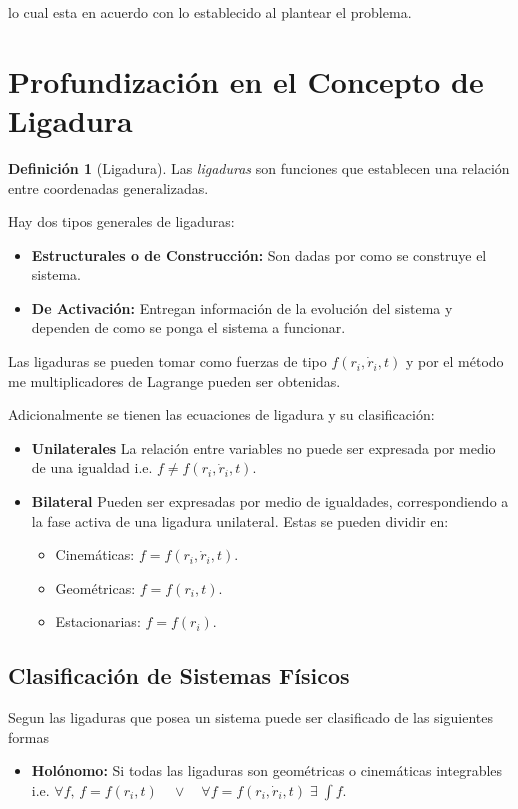 \documentclass{article}
\theoremstyle{definition}
\newtheorem*{definition}{Definición}
\begin{document}
lo cual esta en acuerdo con lo establecido al plantear el problema.

\section{Profundización en el Concepto de Ligadura}
\begin{definition}[Ligadura]
	Las \emph{ligaduras} son funciones que establecen una relación entre coordenadas generalizadas.
\end{definition}

Hay dos tipos generales de ligaduras:

\begin{itemize}
	\item \textbf{Estructurales o de Construcción:} Son dadas por como se construye el sistema.
	\item \textbf{De Activación:} Entregan información de la evolución del sistema y dependen de como se ponga el sistema a funcionar.
\end{itemize}

Las ligaduras se pueden tomar como fuerzas de tipo $f(r_i, \dot{r}_i, t)$ y por el método me multiplicadores de Lagrange pueden ser obtenidas.

Adicionalmente se tienen las ecuaciones de ligadura y su clasificación:

\begin{itemize}
	\item \textbf{Unilaterales} La relación entre variables no puede ser expresada por medio de una igualdad i.e. $f \ne f(r_i, \dot{r}_i, t)$.
	\item \textbf{Bilateral} Pueden ser expresadas por medio de igualdades, correspondiendo a la fase activa de una ligadura unilateral. Estas se pueden dividir en:
		\begin{itemize}
			\item Cinemáticas: $f = f(r_i, \dot{r}_i, t)$.
			\item Geométricas: $f = f(r_i, t)$.
			\item Estacionarias: $f = f(r_i)$.
		\end{itemize}
\end{itemize}

\subsection{Clasificación de Sistemas Físicos}
Segun las ligaduras que posea un sistema puede ser clasificado de las siguientes formas

\begin{itemize}
	\item \textbf{Holónomo:} Si todas las ligaduras son geométricas o cinemáticas integrables i.e. $\forall f, \, f = f(r_i, t) \quad \lor \quad \forall f = f(r_i, \dot{r}_i, t) \; \exists \; \int f.$
\end{itemize}
\end{document}
